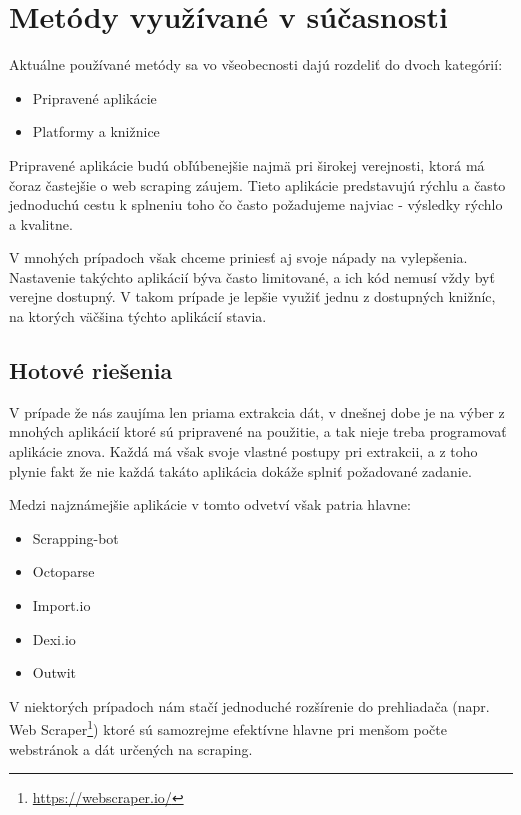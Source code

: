 \section{Metódy využívané v súčasnosti}

Aktuálne používané metódy sa vo všeobecnosti dajú rozdeliť do dvoch kategórií:
\begin{itemize}
    \item {Pripravené aplikácie}
    \item {Platformy a knižnice}
\end{itemize}

\bigskip

Pripravené aplikácie budú obľúbenejšie najmä pri širokej verejnosti, ktorá má čoraz častejšie o web scraping záujem. Tieto aplikácie predstavujú rýchlu a často jednoduchú cestu k splneniu toho čo často požadujeme najviac - výsledky rýchlo a kvalitne.

V mnohých prípadoch však chceme priniesť aj svoje nápady na vylepšenia. Nastavenie takýchto aplikácií býva často limitované, a ich kód nemusí vždy byť verejne dostupný. V takom prípade je lepšie využiť jednu z dostupných knižníc, na ktorých väčšina týchto aplikácií stavia. 

\subsection{Hotové riešenia}
V prípade že nás zaujíma len priama extrakcia dát, v dnešnej dobe je na výber z mnohých aplikácií ktoré sú pripravené na použitie, a tak nieje treba programovať aplikácie znova. Každá má však svoje vlastné postupy pri extrakcii, a z toho plynie fakt že nie každá takáto aplikácia dokáže splniť požadované zadanie. 

\newpage
Medzi najznámejšie aplikácie v tomto odvetví však patria hlavne\cite{WebScrap}:

\begin{itemize}
    \item {Scrapping-bot}
    \item {Octoparse}
    \item {Import.io}
    \item {Dexi.io}
    \item {Outwit}
\end{itemize}

V niektorých prípadoch nám stačí jednoduché rozšírenie do prehliadača (napr. Web Scraper\footnote{\url{https://webscraper.io/}}) ktoré sú samozrejme efektívne hlavne pri menšom počte webstránok a dát určených na scraping. 

